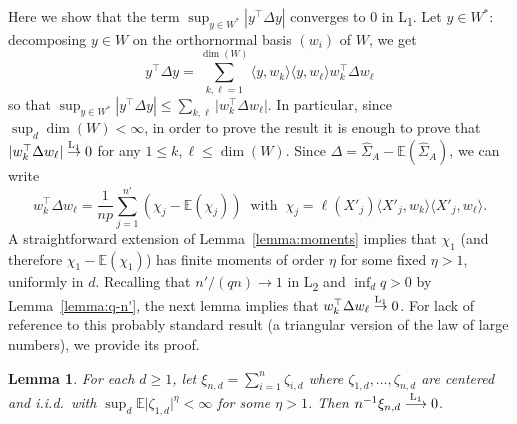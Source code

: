 \documentclass[]{article}
\newcommand{\E}{\mathbb{E}}
\newcommand{\Lone}{\stackrel{\text{\textnormal{L\textsubscript{1}}}}{\longrightarrow}}
\newcommand{\lone}{\stackrel{\text{\textnormal{L\textsubscript{1}}}}{\to}}
\theoremstyle{plain}
\newtheorem{lemma}{Lemma}[section]
\theoremstyle{definition}
\begin{document}
Here we show that the term $\sup_{y \in W^*} \left \lvert y^\top \Delta y \right \rvert$ converges to $0$ in L\textsubscript1. Let $y \in W^*$: decomposing $y \in W$ on the orthornormal basis $(w_i)$ of $W$, we get
\[ y^\top \Delta y = \sum_{k, \ell = 1}^{\dim(W)} \langle y, w_k \rangle \langle y, w_\ell \rangle w_k^\top \Delta w_\ell \]
so that $\sup_{y \in W^*} \left \lvert y^\top \Delta y \right \rvert \leq \sum_{k, \ell} \lvert w_k^\top \Delta w_\ell \rvert$. In particular, since $\sup_d \dim(W) < \infty$, in order to prove the result it is enough to prove that $\lvert w_k^\top \Delta w_\ell \rvert \lone 0$ for any $1 \leq k, \ell \leq \dim(W)$. Since $\Delta = \hat \Sigma_A - \E(\hat \Sigma_A)$, we can write
\[ w_k^\top \Delta w_\ell = \frac{1}{np} \sum_{j=1}^{n'} \left( \chi_j - \E(\chi_j) \right) \ \text{ with } \ \chi_j = \ell(X'_j) \langle X'_j, w_k \rangle \langle X'_j, w_\ell \rangle. \]
A straightforward extension of Lemma~\ref{lemma:moments} implies that $\chi_1$ (and therefore $\chi_1 - \E(\chi_1)$) has finite moments of order $\eta$ for some fixed $\eta > 1$, uniformly in $d$. Recalling that $n'/(qn) \to 1$ in L\textsubscript2 and $\inf_d q > 0$ by Lemma~\ref{lemma:q-n'}, the next lemma implies that $w_k^\top \Delta w_\ell \lone 0$. For lack of reference to this probably standard result (a triangular version of the law of large numbers), we provide its proof.

\begin{lemma}\label{lem:triangular-lln}
	For each $d \geq 1$, let $\xi_{n,d} = \sum_{i=1}^n \zeta_{i,d}$ where $\zeta_{1,d}, \ldots, \zeta_{n,d}$ are centered and i.i.d.\ with $\sup_d \E\lvert \zeta_{1,d}\rvert^\eta < \infty$ for some $\eta > 1$. Then $n^{-1}\xi_{n,d} \Lone 0$.
\end{lemma}
\end{document}
